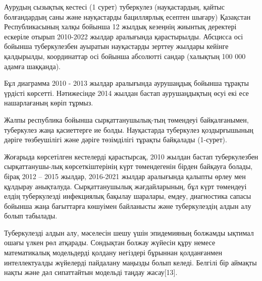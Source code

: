 \begin{multicols}{2}

Аурудың сызықтық кестесі (1 сурет) туберкулез (науқастардың, қайтыс
болғандардың саны және науқастарды бациллярлық есептен шығару) Қазақстан
Республикасының халқы бойынша 12 жылдық кезеңнің жиынтық деректері
ескеріле отырып 2010-2022 жылдар аралығында қарастырылды. Абсцисса осі
бойынша туберкулезбен ауыратын науқастарды зерттеу жылдары кейінге
қалдырылды, координаттар осі бойынша абсолютті сандар (халықтың 100 000
адамға шаққанда).

Бұл диаграмма 2010 - 2013 жылдар аралығында аурушаңдық бойынша тұрақты
үрдісті көрсетті. Нәтижесінде 2014 жылдан бастап аурушаңдықтың өсуі екі
есе нашарлағаның көріп тұрмыз.

Жалпы республика бойынша сырқаттанушылық-тың төмендеуі байқалғанымен,
туберкулез жаңа қасиеттерге ие болды. Науқастарда туберкулез
қоздырғышының дәріге төзбеушілігі және дәріге төзімділігі тұрақты
байқалады (1-сурет).

Жоғарыда көрсетілген кестелерді қарастырсақ, 2010 жылдан бастап
туберкулезбен сырқаттанушы-лық көрсеткіштерінің күрт төмендегенін бірден
байқауға болады, бірақ 2012 -- 2015 жылдар, 2016-2021 жылдар аралығында
қалыпты өрлеу мен құлдырау анықталуда. Сырқаттанушылық жағдайларының,
бұл күрт төмендеуі елдің туберкулезді инфекциялық бақылау шаралары,
емдеу, диагностика сапасы бойынша жаңа бағыттарға көшуімен байланысты
және туберкулездің алдын алу болып табылады.

Туберкулезді алдын алу, мәселесін шешу үшін эпидемияның болжамды ықтимал
ошағы үлкен рөл атқарады. Сондықтан болжау жүйесін құру немесе
математикалық модельдерді қолдану негіздері бұрыннан қолданғанмен
интеллектуалды жүйелерді пайдалану маңызды болып келеді. Белгілі бір
аймақты нақты және дәл сипаттайтын модельді таңдау жасау{[}13{]}.
\end{multicols}
